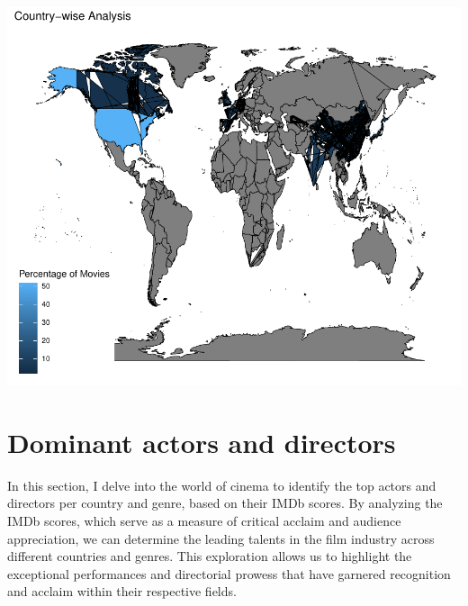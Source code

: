 \documentclass[11pt,preprint, authoryear]{elsarticle}
\numberwithin{equation}{section}
\numberwithin{figure}{section}
\numberwithin{table}{section}
\begin{document}
\includegraphics{Question4_files/figure-latex/unnamed-chunk-3-1.pdf}

\hypertarget{dominant-actors-and-directors}{%
\section{Dominant actors and
directors}\label{dominant-actors-and-directors}}

In this section, I delve into the world of cinema to identify the top
actors and directors per country and genre, based on their IMDb scores.
By analyzing the IMDb scores, which serve as a measure of critical
acclaim and audience appreciation, we can determine the leading talents
in the film industry across different countries and genres. This
exploration allows us to highlight the exceptional performances and
directorial prowess that have garnered recognition and acclaim within
their respective fields.
\end{document}
